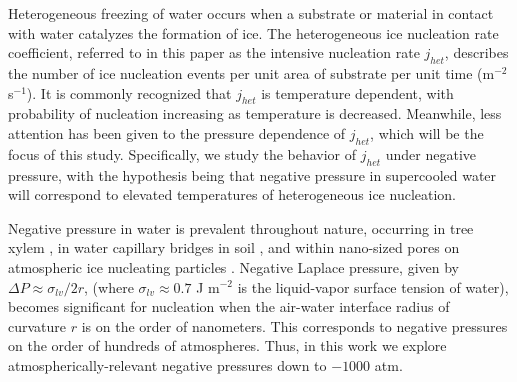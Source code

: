 \documentclass[journal abbreviation, manuscript]{copernicus}
\begin{document}
\begin{abstract}
\end{abstract}


\introduction

Heterogeneous freezing of water occurs when a substrate or material in contact with water catalyzes the formation of ice. The heterogeneous ice nucleation rate coefficient, referred to in this paper as the intensive nucleation rate $j_{het}$, describes the number of ice nucleation events per unit area of substrate per unit time (m$^{-2}$ s$^{-1}$). It is commonly recognized that $j_{het}$ is temperature dependent, with probability of nucleation increasing as temperature is decreased. Meanwhile, less attention has been given to the pressure dependence of $j_{het}$, which will be the focus of this study. Specifically, we study the behavior of $j_{het}$ under negative pressure, with the hypothesis being that negative pressure in supercooled water will correspond to elevated temperatures of heterogeneous ice nucleation.

Negative pressure in water is prevalent throughout nature, occurring in tree xylem \citep{jacobsen2007xylem}, in water capillary bridges in soil \citep{seiphoori2020}, and within nano-sized pores on atmospheric ice nucleating particles \citep{david2020role,marcolli2020technical,klumpp2023comparing}. Negative Laplace pressure, given by $\Delta P \approx \sigma_{lv}/2r$, (where $\sigma_{lv} \approx 0.7$ J m$^{-2}$  is the liquid-vapor surface tension of water), becomes significant for nucleation when the air-water interface radius of curvature $r$ is on the order of nanometers. This corresponds to negative pressures on the  order of  hundreds of atmospheres. Thus, in this work we explore atmospherically-relevant negative pressures down to $-1000$ atm. %
\end{document}
